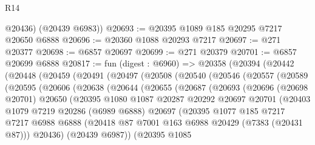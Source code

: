 \begin{lexlean}{R14}
\begin{coremodule}
        @20436)
      (@20439 @6983))
@20693 := @20395 @1089 @185 @20295 @7217 @20650 @6888
@20696 := @20360 @1088 @20293 @7217
@20697 := @271 @20377
@20698 := @6857 @20697
@20699 := @271 @20379
@20701 := @6857 @20699 @6888
@20817 := fun (digest : @6960) =>
  @20358
    (@20394
      (@20442
        (@20448
          (@20459
            (@20491
              (@20497
                (@20508
                  (@20540
                    (@20546
                      (@20557
                        (@20589
                          (@20595
                            (@20606
                              (@20638
                                (@20644
                                  (@20655
                                    (@20687
                                      (@20693
                                        (@20696
                                          (@20698 @20701)
                                          @20650
                                          (@20395
                                            @1080
                                            @1087
                                            @20287
                                            @20292
                                            @20697
                                            @20701
                                            (@20403
                                              @1079
                                              @7219
                                              @20286
                                              (@6989 @6888)
                                              @20697
                                              (@20395
                                                @1077
                                                @185
                                                @7217
                                                @7217
                                                @6988
                                                @6888
                                                (@20418
                                                  @87
                                                  @7001
                                                  @163
                                                  @6988
                                                  @20429
                                                  (@7383 (@20431 @87)))
                                                @20436)
                                              (@20439 @6987))
                                            (@20395
                                              @1085

\end{coremodule}
\end{lexlean}
